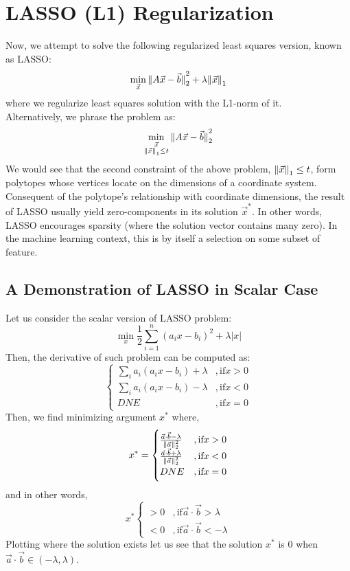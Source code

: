 \section{LASSO (L1) Regularization}
Now, we attempt to solve the following regularized least squares version, known as LASSO:
\[
    \min_{\vec{x}} \pnorm[2]{A \vec{x} - \vec{b}}{2} + \lambda \pnorm{\vec{x}}{1}
\]
where we regularize least squares solution with the L1-norm of it. \\
Alternatively, we phrase the problem as:
\[
    \min_{
        \substack{
            \vec{x} \\
            \pnorm{\vec{x}}{1} \leq t
        }
    } \pnorm[2]{A \vec{x} - \vec{b}}{2}
\]
We would see that the second constraint of the above problem, $\pnorm{\vec{x}}{1} \leq t$, form polytopes whose vertices locate on the dimensions of a coordinate system. \\
Consequent of the polytope's relationship with coordinate dimensions, the result of LASSO usually yield zero-components in its solution $\vec{x}^*$.
In other words, LASSO encourages sparsity (where the solution vector contains many zero).
In the machine learning context, this is by itself a selection on some subset of feature.

\subsection{A Demonstration of LASSO in Scalar Case}
Let us consider the scalar version of LASSO problem:
\[
    \min_x \frac{1}{2} \sum_{i = 1}^n {(a_i x - b_i)}^2 + \lambda |x|
\]
Then, the derivative of such problem can be computed as:
\[
    \begin{cases}
        \sum_i a_i(a_i x - b_i) + \lambda &, \text{if} x > 0 \\
        \sum_i a_i(a_i x - b_i) - \lambda &, \text{if} x < 0 \\
        DNE &, \text{if} x = 0
    \end{cases}
\]
Then, we find minimizing argument $x^*$ where,
\[
    x^* =
    \begin{cases}
        \frac{\vec{a} \cdot \vec{b} - \lambda}{\pnorm[2]{\vec{a}}{2}} &, \text{if} x > 0 \\
        \frac{\vec{a} \cdot \vec{b} + \lambda}{\pnorm[2]{\vec{a}}{2}} &, \text{if} x < 0 \\
        DNE &, \text{if} x = 0
    \end{cases}
\]
and in other words,
\[
    x^*
    \begin{cases}
        > 0 &, \text{if} \vec{a} \cdot \vec{b} > \lambda \\
        < 0 &, \text{if} \vec{a} \cdot \vec{b} < -\lambda
    \end{cases}
\]
Plotting where the solution exists let us see that the solution $x^*$ is $0$ when $\vec{a} \cdot \vec{b} \in (-\lambda, \lambda)$.
